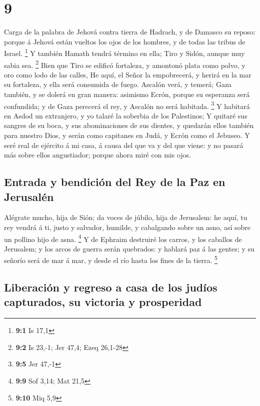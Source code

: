 \hypertarget{section-8}{%
\section{9}\label{section-8}}

 Carga de la palabra de Jehová contra tierra de Hadrach, y
de Damasco su reposo: porque á Jehová están vueltos los ojos de los
hombres, y de todas las tribus de Israel. \footnote{\textbf{9:1} Is 17,1}
 Y también Hamath tendrá término en ella; Tiro y Sidón,
aunque muy sabia sea. \footnote{\textbf{9:2} Is 23,-1; Jer 47,4; Ezeq
  26,1-28}  Bien que Tiro se edificó fortaleza, y amontonó
plata como polvo, y oro como lodo de las calles,  He aquí,
el Señor la empobrecerá, y herirá en la mar su fortaleza, y ella será
consumida de fuego.  Ascalón verá, y temerá; Gaza también, y
se dolerá en gran manera: asimismo Ecrón, porque su esperanza será
confundida; y de Gaza perecerá el rey, y Ascalón no será habitada.
\footnote{\textbf{9:5} Jer 47,-1}  Y habitará en Asdod un
extranjero, y yo talaré la soberbia de los Palestinos;  Y
quitaré sus sangres de su boca, y sus abominaciones de sus dientes, y
quedarán ellos también para nuestro Dios, y serán como capitanes en
Judá, y Ecrón como el Jebuseo.  Y seré real de ejército á mi
casa, á causa del que va y del que viene: y no pasará más sobre ellos
angustiador; porque ahora miré con mis ojos.

\hypertarget{entrada-y-bendiciuxf3n-del-rey-de-la-paz-en-jerusaluxe9n}{%
\subsection{Entrada y bendición del Rey de la Paz en
Jerusalén}\label{entrada-y-bendiciuxf3n-del-rey-de-la-paz-en-jerusaluxe9n}}

 Alégrate mucho, hija de Sión; da voces de júbilo, hija de
Jerusalem: he aquí, tu rey vendrá á ti, justo y salvador, humilde, y
cabalgando sobre un asno, así sobre un pollino hijo de asna. \footnote{\textbf{9:9}
  Sof 3,14; Mat 21,5}  Y de Ephraim destruiré los carros, y
los caballos de Jerusalem; y los arcos de guerra serán quebrados: y
hablará paz á las gentes; y su señorío será de mar á mar, y desde el río
hasta los fines de la tierra. \footnote{\textbf{9:10} Miq 5,9}

\hypertarget{liberaciuxf3n-y-regreso-a-casa-de-los-juduxedos-capturados-su-victoria-y-prosperidad}{%
\subsection{Liberación y regreso a casa de los judíos capturados, su
victoria y
prosperidad}\label{liberaciuxf3n-y-regreso-a-casa-de-los-juduxedos-capturados-su-victoria-y-prosperidad}}

